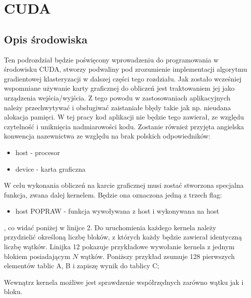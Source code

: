 \chapter{CUDA}
\label{cha:cuda}

\section{Opis środowiska}
\label{sec:opis_cuda}

Ten podrozdział będzie poświęcony wprowadzeniu do programowania w środowisku CUDA, stworzy podwaliny pod zrozumienie implementacji algorytmu gradientowej klasteryzacji w dalszej części tego rozdziału. Jak zostało wcześniej wspomniane używanie karty graficznej do obliczeń jest traktowaniem jej jako urządzenia wejścia/wyjścia. Z tego powodu w zastosowaniach aplikacyjnych należy przechwytywać i obsługiwać zaistaniałe błędy takie jak np. nieudana alokacja pamięci. W tej pracy kod aplikacji nie będzie tego zawierał, ze względu czytelność i uniknięcia nadmiarowości kodu. Zostanie również przyjęta angielska konwencja nazewnictwa ze względu na brak polskich odpowiedników:
\begin{itemize}
\item host - procesor
\item device - karta graficzna
\end{itemize}

W celu wykonania obliczeń na karcie graficznej musi zostać stworzona specjalna funkcja, zwana dalej kernelem. Będzie ona oznaczona jedną z trzech flag:
\begin{itemize}
\item host POPRAW - funkcja wywoływana z host i wykonywana na host
\end{itemize}
, co widać poniżej w linijce 2. Do uruchomienia każdego kernela należy przydzielić określoną liczbę bloków, z których każdy będzie zawierał identyczną liczbę wątków. Linijka 12 pokazuje przykładowe wywołanie kernela z jednym blokiem posiadającym $N$ wątków. Poniższy przykład zsumuje 128 pierwszych elementów tablic A, B i zapiszę wynik do tablicy C;


Wewnątrz kernela możliwe jest sprawdzenie współrzędnych zarówno wątku jak i bloku.



